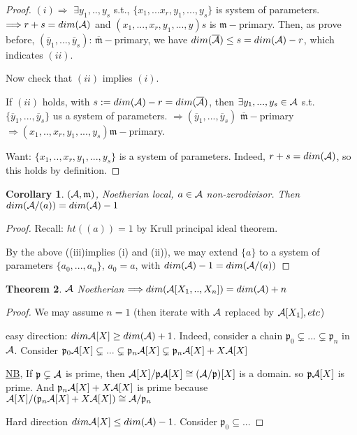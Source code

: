 \documentclass[11pt]{article}
\newtheorem{thm}{Theorem}[section]
\newtheorem{cor}[thm]{Corollary}
\newcommand{\scm}{{\mathfrak m}}
\newcommand{\scp}{{\mathfrak p}}
\newcommand{\cala}{{\cal A}}
\newcommand{\Lrta}{\Longrightarrow}
\begin{document}
\begin{proof}
$(i)\Lrta$ $\exists y_1,..,y_s$ s.t., $\{x_1,...x_r,y_1,...,y_s\}$ is system of parameters.
$\Lrta r+s=dim(\cala)$ and $(x_1,...,x_r,y_1,...,y)s$ is $\scm-$primary. Then, as prove before, $(\overline{y}_1,...,\overline{y}_s)$: $\overline{\scm}-$primary, we have $dim(\overline{\cala})\leq s=dim(\cala)-r$, which indicates $(ii)$.

Now check that $(ii)$ implies $(i)$.

If $(ii)$ holds, with $s:=dim(\cala)-r=dim(\overline{\cala})$, then $\exists y_1,...,y_s\in\cala$ s.t. $\{\overline{y}_1,...,\overline{y}_s\}$ us a system of parameters. $\Lrta(\overline{y}_1,...,\overline{y}_s)$ $\overline{\scm}-$primary $\Lrta (x_1,..,x_r,y_1,...,y_s)\scm-$primary.

Want: $\{x_1,..,x_r,y_1,...,y_s\}$ is a system of parameters. Indeed, $r+s=dim(\cala)$, so this holds by definition. 
\end{proof}

\begin{cor}
$(\cala,\scm)$, Noetherian local, $a\in\cala$ non-zerodivisor. Then $dim(\cala/(a))=dim(\cala)-1$
\end{cor}
\begin{proof}
Recall: $ht((a))=1$ by Krull principal ideal theorem.

By the above ((iii)implies (i) and (ii)), we may extend $\{a\}$ to a system of parameters $\{a_0,...,a_n\}$, $a_0=a$, with $dim(\cala)-1=dim(\cala/(a))$
\end{proof}

\begin{thm}
$\cala$ Noetherian $\Lrta dim(\cala[X_1,..,X_n])=dim(\cala)+n$
\end{thm}
\begin{proof}
We may assume $n=1$ (then iterate with $\cala$ replaced by $\cala[X_1], etc$)

easy direction: $dim \cala[X]\geq dim(\cala)+1$. Indeed, consider a chain $\scp_0\subsetneq ...\subsetneq \scp_n$ in $\cala$. Consider $\scp_0\cala[X]\subsetneq ...\subsetneq \scp_n\cala[X]\subsetneq \scp_n\cala[X]+X\cala[X]$

\underline{NB}, If $\scp\subsetneq \cala$ is prime, then $\cala[X]/\scp\cala[X]\cong (\cala/\scp)[X]$ is  a domain. so $\scp\cala[X]$ is prime.
And $\scp_n\cala[X]+X\cala[X]$ is prime because $\cala[X]/(\scp_n\cala[X]+X\cala[X])\cong \cala/\scp_n$

Hard direction $dim\cala[X]\leq dim(\cala)-1$. Consider $\scp_0\subseteq...$
\end{proof}
\end{document}
